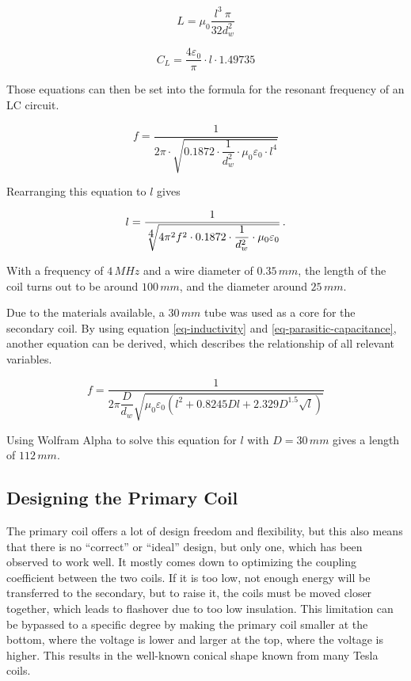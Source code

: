 \begin{equation}
    L = \mu_0 \frac{l^3\ \pi}{32 d_w^2}
\end{equation}

\begin{equation}
    C_L = \frac{4\varepsilon_0}{\pi} \cdot l \cdot 1.49735
\end{equation}

Those equations can then be set into the formula for the resonant frequency of an LC circuit.

\begin{equation}
    f = \frac{1}{2\pi \cdot \sqrt{0.1872 \cdot \dfrac{1}{d_w^2} \cdot \mu_0 \varepsilon_0 \cdot l^4}}
\end{equation}

Rearranging this equation to \(l\) gives

\begin{equation}
    l = \frac{1}{\sqrt[\scalebox{1}{4}]{4\pi^2 f^2 \cdot0.1872 \cdot \dfrac{1}{d_w^2} \cdot \mu_0 \varepsilon_0}}\,.
\end{equation}

With a frequency of \(4\,MHz\) and a wire diameter of \(0.35\,mm\), the length of the coil turns out to be around \(100\,mm\), and the diameter around \(25\,mm\).

Due to the materials available, a \(30\,mm\) tube was used as a core for the secondary coil. By using equation \ref{eq-inductivity} and \ref{eq-parasitic-capacitance}, another equation can be derived, which describes the relationship of all relevant variables.

\begin{equation}
    f = \frac{1}{2\pi \dfrac{D}{d_w} \sqrt{\mu_0 \varepsilon_0 \left( l^2 + 0.8245 D l + 2.329 D^{1.5} \sqrt{l} \right)}}
\end{equation}

Using Wolfram Alpha to solve this equation for \(l\) with \(D = 30\,mm\) gives a length of \(112\,mm\).

\subsection{Designing the Primary Coil}
\label{sec:designing-the-primary}

The primary coil offers a lot of design freedom and flexibility, but this also means that there is no \enquote{correct} or \enquote{ideal} design, but only one, which has been observed to work well. It mostly comes down to optimizing the coupling coefficient between the two coils. If it is too low, not enough energy will be transferred to the secondary, but to raise it, the coils must be moved closer together, which leads to flashover due to too low insulation. %
This limitation can be bypassed to a specific degree by making the primary coil smaller at the bottom, where the voltage is lower and larger at the top, where the voltage is higher. This results in the well-known conical shape known from many Tesla coils.


